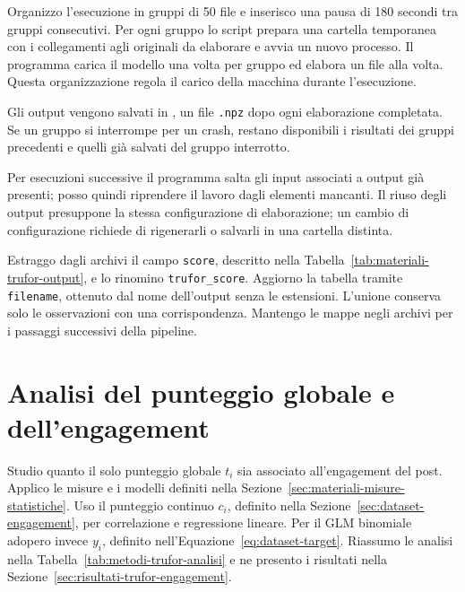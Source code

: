 Organizzo l'esecuzione in gruppi di 50 file e inserisco una pausa di 180 secondi tra gruppi consecutivi. Per ogni gruppo lo script prepara una cartella temporanea con i collegamenti agli originali da elaborare e avvia un nuovo processo. Il programma carica il modello una volta per gruppo ed elabora un file alla volta. Questa organizzazione regola il carico della macchina durante l'esecuzione.

Gli output vengono salvati in , un file \texttt{.npz} dopo ogni elaborazione completata. Se un gruppo si interrompe per un crash, restano disponibili i risultati dei gruppi precedenti e quelli già salvati del gruppo interrotto.

Per esecuzioni successive il programma salta gli input associati a output già presenti; posso quindi riprendere il lavoro dagli elementi mancanti. Il riuso degli output presuppone la stessa configurazione di elaborazione; un cambio di configurazione richiede di rigenerarli o salvarli in una cartella distinta.

Estraggo dagli archivi il campo \texttt{score}, descritto nella Tabella~\ref{tab:materiali-trufor-output}, e lo rinomino \texttt{trufor\_score}. Aggiorno la tabella  tramite \texttt{filename}, ottenuto dal nome dell'output senza le estensioni. L'unione conserva solo le osservazioni con una corrispondenza. Mantengo le mappe negli archivi per i passaggi successivi della pipeline.

\section{Analisi del punteggio globale e dell'engagement}
\label{sec:metodi-trufor-engagement}

Studio quanto il solo punteggio globale $t_i$ sia associato all'engagement del post. Applico le misure e i modelli definiti nella Sezione~\ref{sec:materiali-misure-statistiche}. Uso il punteggio continuo $c_i$, definito nella Sezione~\ref{sec:dataset-engagement}, per correlazione e regressione lineare. Per il GLM binomiale adopero invece $y_i$, definito nell'Equazione~\ref{eq:dataset-target}. Riassumo le analisi nella Tabella~\ref{tab:metodi-trufor-analisi} e ne presento i risultati nella Sezione~\ref{sec:risultati-trufor-engagement}.

